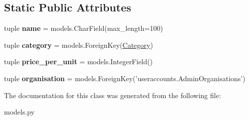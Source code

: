 \subsection*{Static Public Attributes}
\begin{DoxyCompactItemize}
\item 
\hypertarget{classlibrehatti_1_1catalog_1_1models_1_1Product_aa001ecb05e4ad78d3438351cd1ad70fd}{tuple {\bfseries name} = models.\-Char\-Field(max\-\_\-length=100)}\label{classlibrehatti_1_1catalog_1_1models_1_1Product_aa001ecb05e4ad78d3438351cd1ad70fd}

\item 
\hypertarget{classlibrehatti_1_1catalog_1_1models_1_1Product_a1125cc90bcd74b53e19efb82d32305d0}{tuple {\bfseries category} = models.\-Foreign\-Key(\hyperlink{classlibrehatti_1_1catalog_1_1models_1_1Category}{Category})}\label{classlibrehatti_1_1catalog_1_1models_1_1Product_a1125cc90bcd74b53e19efb82d32305d0}

\item 
\hypertarget{classlibrehatti_1_1catalog_1_1models_1_1Product_a75c525f7f2cd2fb250c59fe29c28debc}{tuple {\bfseries price\-\_\-per\-\_\-unit} = models.\-Integer\-Field()}\label{classlibrehatti_1_1catalog_1_1models_1_1Product_a75c525f7f2cd2fb250c59fe29c28debc}

\item 
\hypertarget{classlibrehatti_1_1catalog_1_1models_1_1Product_a30c965e403d19f8a328e4e990b4fddff}{tuple {\bfseries organisation} = models.\-Foreign\-Key('useraccounts.\-Admin\-Organisations')}\label{classlibrehatti_1_1catalog_1_1models_1_1Product_a30c965e403d19f8a328e4e990b4fddff}

\end{DoxyCompactItemize}


The documentation for this class was generated from the following file\-:\begin{DoxyCompactItemize}
\item 
models.\-py\end{DoxyCompactItemize}

